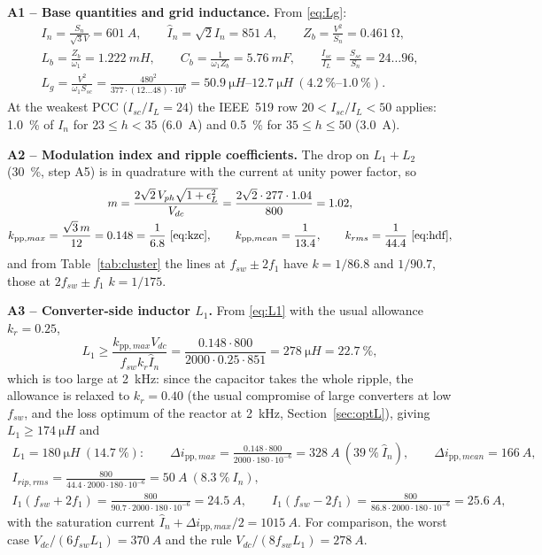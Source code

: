 \documentclass[10pt,a4paper]{scrartcl}
\newcommand{\Vdc}{V_{dc}}
\newcommand{\fsw}{f_{sw}}
\newcommand{\Lg}{L_{g}}
\newcommand{\pp}{\mathrm{pp}}
\begin{document}
\begin{onehalfspace}
\textbf{A1 -- Base quantities and grid inductance.} From \eqref{eq:Lg}:
\begin{gather*}
I_n = \frac{S_n}{\sqrt3 V} = \SI{601}{A},\qquad \hat I_n = \sqrt2 I_n = \SI{851}{A},\qquad Z_b = \frac{V^2}{S_n} = \SI{0.461}{\ohm},\\
L_b = \frac{Z_b}{\omega_1} = \SI{1.222}{mH},\qquad C_b = \frac{1}{\omega_1 Z_b} = \SI{5.76}{mF},\qquad \frac{I_{sc}}{I_L} = \frac{S_{sc}}{S_n} = 24 \ldots 96,\\
\Lg = \frac{V^2}{\omega_1 S_{sc}} = \frac{480^2}{377 \cdot (12 \ldots 48)\cdot 10^6} = \SIrange{50.9}{12.7}{\micro H}\ (\SIrange{4.2}{1.0}{\percent}).
\end{gather*}
At the weakest PCC ($I_{sc}/I_L = 24$) the IEEE~519 row $20 < I_{sc}/I_L < 50$ applies: \SI{1.0}{\percent} of $I_n$ for $23 \le h < 35$ (\SI{6.0}{A}) and \SI{0.5}{\percent} for $35 \le h \le 50$ (\SI{3.0}{A}).

\textbf{A2 -- Modulation index and ripple coefficients.} The drop on $L_1 + L_2$ (\SI{30}{\percent}, step A5) is in quadrature with the current at unity power factor, so
\begin{gather*}
m = \frac{2\sqrt2\,V_{ph}\sqrt{1 + \epsilon_L^2}}{\Vdc} = \frac{2\sqrt2 \cdot 277 \cdot 1.04}{800} = 1.02,\\
k_{\pp,max} = \frac{\sqrt3\,m}{12} = 0.148 = \frac{1}{6.8}\ \text{\eqref{eq:kzc}},\qquad k_{\pp,mean} = \frac{1}{13.4},\qquad k_{rms} = \frac{1}{44.4}\ \text{\eqref{eq:hdf}},
\end{gather*}
and from Table~\ref{tab:cluster} the lines at $\fsw \pm 2f_1$ have $k = 1/86.8$ and $1/90.7$, those at $2\fsw \pm f_1$ $k = 1/175$.

\textbf{A3 -- Converter-side inductor $L_1$.} From \eqref{eq:L1} with the usual allowance $k_r = 0.25$,
\begin{equation*}
L_1 \ge \frac{k_{\pp,max}\Vdc}{\fsw k_r \hat I_n} = \frac{0.148 \cdot 800}{2000 \cdot 0.25 \cdot 851} = \SI{278}{\micro H} = \SI{22.7}{\percent},
\end{equation*}
which is too large at \SI{2}{kHz}: since the capacitor takes the whole ripple, the allowance is relaxed to $k_r = 0.40$ (the usual compromise of large converters at low $\fsw$, and the loss optimum of the reactor at \SI{2}{kHz}, Section~\ref{sec:optL}), giving $L_1 \ge \SI{174}{\micro H}$ and
\begin{gather*}
L_1 = \SI{180}{\micro H}\ (\SI{14.7}{\percent}):\qquad
\Delta i_{\pp,max} = \frac{0.148 \cdot 800}{2000 \cdot 180\cdot 10^{-6}} = \SI{328}{A}\ (\SI{39}{\percent}\ \hat I_n),\qquad
\Delta i_{\pp,mean} = \SI{166}{A},\\
I_{rip,rms} = \frac{800}{44.4 \cdot 2000 \cdot 180\cdot 10^{-6}} = \SI{50}{A}\ (\SI{8.3}{\percent}\ I_n),\\
I_1(\fsw + 2f_1) = \frac{800}{90.7 \cdot 2000 \cdot 180\cdot 10^{-6}} = \SI{24.5}{A},\qquad I_1(\fsw - 2f_1) = \frac{800}{86.8 \cdot 2000 \cdot 180\cdot 10^{-6}} = \SI{25.6}{A},
\end{gather*}
with the saturation current $\hat I_n + \Delta i_{\pp,max}/2 = \SI{1015}{A}$. For comparison, the worst case $\Vdc/(6\fsw L_1) = \SI{370}{A}$ and the rule $\Vdc/(8\fsw L_1) = \SI{278}{A}$.


\end{onehalfspace}
\end{document}
